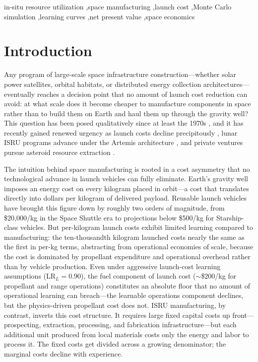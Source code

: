 \documentclass[preprint,12pt]{elsarticle}
\begin{document}
\begin{frontmatter}
\begin{keyword}
in-situ resource utilization \sep space manufacturing \sep launch cost \sep Monte Carlo simulation \sep learning curves \sep net present value \sep space economics
\end{keyword}

\end{frontmatter}

\linenumbers

\section{Introduction}
\label{sec:introduction}

Any program of large-scale space infrastructure construction---whether solar power satellites, orbital habitats, or distributed energy collection architectures---eventually reaches a decision point that no amount of launch cost reduction can avoid: at what scale does it become cheaper to manufacture components in space rather than to build them on Earth and haul them up through the gravity well? This question has been posed qualitatively since at least the 1970s \cite{oneill1974,oneill1976}, and it has recently gained renewed urgency as launch costs decline precipitously \cite{jones2018}, lunar ISRU programs advance under the Artemis architecture \cite{sanders2015}, and private ventures pursue asteroid resource extraction \cite{elvis2012,andrews2015}.

The intuition behind space manufacturing is rooted in a cost asymmetry that no technological advance in launch vehicles can fully eliminate. Earth's gravity well imposes an energy cost on every kilogram placed in orbit---a cost that translates directly into dollars per kilogram of delivered payload. Reusable launch vehicles have brought this figure down by roughly two orders of magnitude, from \$20{,}000/kg in the Space Shuttle era to projections below \$500/kg for Starship-class vehicles. But per-kilogram launch costs exhibit limited learning compared to manufacturing: the ten-thousandth kilogram launched costs nearly the same as the first in per-kg terms, abstracting from operational economies of scale, because the cost is dominated by propellant expenditure and operational overhead rather than by vehicle production. Even under aggressive launch-cost learning assumptions (LR$_L = 0.90$), the fuel component of launch cost ($\sim$\$200/kg for propellant and range operations) constitutes an absolute floor that no amount of operational learning can breach---the learnable operations component declines, but the physics-driven propellant cost does not. ISRU manufacturing, by contrast, inverts this cost structure. It requires large fixed capital costs up front---prospecting, extraction, processing, and fabrication infrastructure---but each additional unit produced from local materials costs only the energy and labor to process it. The fixed costs get divided across a growing denominator; the marginal costs decline with experience.
\end{document}
